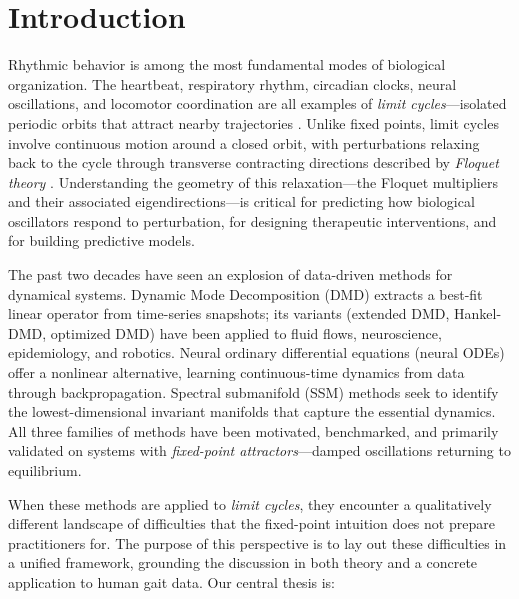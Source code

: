 \documentclass[12pt]{article}
\begin{document}
\section{Introduction}
\label{sec:intro}

Rhythmic behavior is among the most fundamental modes of biological
organization. The heartbeat, respiratory rhythm, circadian clocks, neural
oscillations, and locomotor coordination are all examples of \emph{limit
cycles}---isolated periodic orbits that attract nearby trajectories
\citep{strogatz2015nonlinear, guckenheimer1983nonlinear}. Unlike fixed points,
limit cycles involve continuous motion around a closed orbit, with perturbations
relaxing back to the cycle through transverse contracting directions described
by \emph{Floquet theory} \citep{floquet1883equations, chicone2006ordinary}.
Understanding the geometry of this relaxation---the Floquet multipliers
and their associated eigendirections---is critical for predicting how
biological oscillators respond to perturbation, for designing therapeutic
interventions, and for building predictive models.

The past two decades have seen an explosion of data-driven methods for
dynamical systems. Dynamic Mode Decomposition (DMD)
\citep{schmid2010dynamic, kutz2016dynamic} extracts a best-fit linear operator
from time-series snapshots; its variants (extended DMD, Hankel-DMD, optimized
DMD) have been applied to fluid flows, neuroscience, epidemiology, and
robotics. Neural ordinary differential equations (neural ODEs)
\citep{chen2018neural} offer a nonlinear alternative, learning continuous-time
dynamics from data through backpropagation. Spectral submanifold (SSM) methods
\citep{haller2016nonlinear, cenedese2022data} seek to identify the
lowest-dimensional invariant manifolds that capture the essential dynamics.
All three families of methods have been motivated, benchmarked, and primarily
validated on systems with \emph{fixed-point attractors}---damped oscillations
returning to equilibrium.

When these methods are applied to \emph{limit cycles}, they encounter a
qualitatively different landscape of difficulties that the fixed-point
intuition does not prepare practitioners for. The purpose of this perspective
is to lay out these difficulties in a unified framework, grounding the
discussion in both theory and a concrete application to human gait data.
Our central thesis is:
\end{document}
